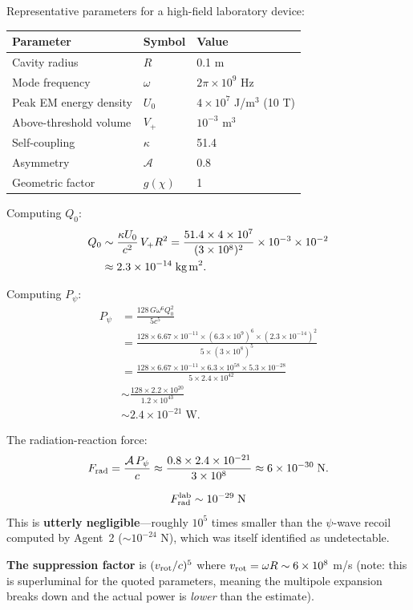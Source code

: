 \documentclass[11pt]{article}
\begin{document}
Representative parameters for a high-field laboratory device:
\begin{center}
\begin{tabular}{lll}
\toprule
Parameter & Symbol & Value \\
\midrule
Cavity radius & $R$ & 0.1 m \\
Mode frequency & $\omega$ & $2\pi \times 10^9$ Hz \\
Peak EM energy density & $U_0$ & $4 \times 10^7$ J/m$^3$ (10 T) \\
Above-threshold volume & $V_+$ & $10^{-3}$ m$^3$ \\
Self-coupling & $\kappa$ & 51.4 \\
Asymmetry & $\mathcal{A}$ & 0.8 \\
Geometric factor & $g(\chi)$ & 1 \\
\bottomrule
\end{tabular}
\end{center}

Computing $Q_0$:
\begin{align}
Q_0 &\sim \frac{\kappa U_0}{c^2}\,V_+ R^2
= \frac{51.4 \times 4\times10^7}{(3\times10^8)^2}
\times 10^{-3} \times 10^{-2} \nonumber\\
&\approx 2.3 \times 10^{-14}\;\text{kg\,m}^2.
\end{align}

Computing $P_\psi$:
\begin{align}
P_\psi &= \frac{128\,G\omega^6 Q_0^2}{5c^5} \nonumber\\
&= \frac{128 \times 6.67\times10^{-11} \times (6.3\times10^9)^6
\times (2.3\times10^{-14})^2}{5 \times (3\times10^8)^5} \nonumber\\
&= \frac{128 \times 6.67\times10^{-11} \times 6.3\times10^{58}
\times 5.3\times10^{-28}}{5 \times 2.4\times10^{42}} \nonumber\\
&\sim \frac{128 \times 2.2\times10^{20}}{1.2\times10^{43}} \nonumber\\
&\sim 2.4 \times 10^{-21}\;\text{W}.
\end{align}

The radiation-reaction force:
\begin{equation}
F_{\rm rad} = \frac{\mathcal{A}\,P_\psi}{c}
\approx \frac{0.8 \times 2.4\times10^{-21}}{3\times10^8}
\approx 6 \times 10^{-30}\;\text{N}.
\end{equation}

\begin{tcolorbox}[colback=yellow!5!white, colframe=yellow!60!black,
  title=Laboratory Radiation-Reaction Force]
\begin{equation}
F_{\rm rad}^{\rm lab} \sim 10^{-29}\;\text{N}
\end{equation}
This is \textbf{utterly negligible}---roughly $10^5$ times smaller
than the $\psi$-wave recoil computed by Agent~2 ($\sim 10^{-24}$ N),
which was itself identified as undetectable.

\textbf{The suppression factor} is $(v_{\rm rot}/c)^5$ where
$v_{\rm rot} = \omega R \sim 6\times10^8$ m/s (note: this is
superluminal for the quoted parameters, meaning the multipole
expansion breaks down and the actual power is \emph{lower} than
the estimate).
\end{tcolorbox}
\end{document}
